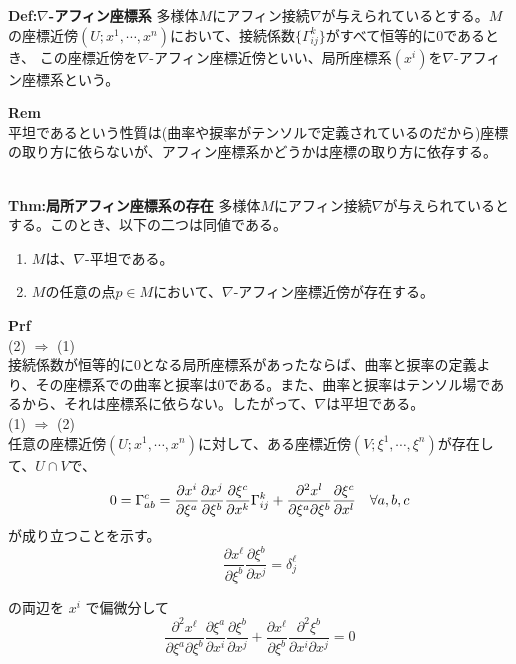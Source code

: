 \documentclass[a4paper,11pt]{jsarticle}
\numberwithin{equation}{section}
\begin{document}
\begin{itembox}[l]{\textbf{Def:$\nabla$-アフィン座標系}}
    多様体$M$にアフィン接続$\nabla$が与えられているとする。$M$の座標近傍$(U;x^1,\cdots,x^n)$において、接続係数$\{\Gamma_{ij}^k\}$がすべて恒等的に0であるとき、
    この座標近傍を$\nabla$-アフィン座標近傍といい、局所座標系$(x^i)$を$\nabla$-アフィン座標系という。
\end{itembox}

\textbf{Rem}\\
平坦であるという性質は(曲率や捩率がテンソルで定義されているのだから)座標の取り方に依らないが、アフィン座標系かどうかは座標の取り方に依存する。\\\\

\begin{itembox}[l]{\textbf{Thm:局所アフィン座標系の存在}}
    多様体$M$にアフィン接続$\nabla$が与えられているとする。このとき、以下の二つは同値である。
    \begin{enumerate}
        \item $M$は、$\nabla$-平坦である。
        \item $M$の任意の点$p \in M$において、$\nabla$-アフィン座標近傍が存在する。
    \end{enumerate}
\end{itembox}
\textbf{Prf}\\
(2) $\Rightarrow$ (1)\\
接続係数が恒等的に0となる局所座標系があったならば、曲率と捩率の定義より、その座標系での曲率と捩率は0である。また、曲率と捩率はテンソル場であるから、それは座標系に依らない。したがって、$\nabla$は平坦である。\\
(1) $\Rightarrow$ (2)\\
任意の座標近傍$(U;x^1,\cdots,x^n)$に対して、ある座標近傍$(V;\xi^1,\cdots,\xi^n)$が存在して、$U \cap V$で、
\begin{equation}
    \label{eq:affine_coordinate}
    0=\Gamma_{ab}^c = \pdv{x^i}{\xi^a}\pdv{x^j}{\xi^b}\pdv{\xi^c}{x^k}\Gamma_{ij}^k + \pdv[2]{x^l}{\xi^a}{\xi^b}\pdv{\xi^c}{x^l} \quad \forall a,b,c
\end{equation}
が成り立つことを示す。\\

\begin{equation}
    \frac{\partial x^\ell}{\partial \xi^b} \frac{\partial \xi^b}{\partial x^j} = \delta^\ell_j
    \end{equation}
    
    の両辺を $x^i$ で偏微分して
    \begin{equation}
    \frac{\partial^2 x^\ell}{\partial \xi^a \partial \xi^b} \frac{\partial \xi^a}{\partial x^i} \frac{\partial \xi^b}{\partial x^j} + \frac{\partial x^\ell}{\partial \xi^b} \frac{\partial^2 \xi^b}{\partial x^i \partial x^j} = 0
    \end{equation}
    
\end{document}
